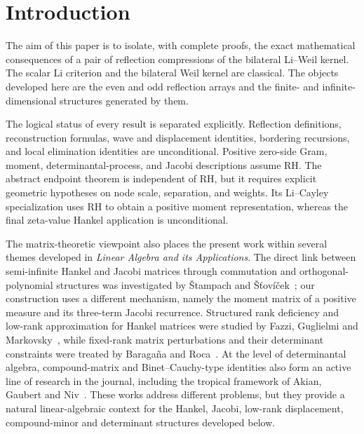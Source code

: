 \documentclass[preprint,12pt]{elsarticle}
\numberwithin{equation}{section}
\theoremstyle{plain}
\theoremstyle{definition}
\theoremstyle{remark}
\newcommand{\RH}{\mathrm{RH}}
\begin{document}
\section{Introduction}
The aim of this paper is to isolate, with complete proofs, the exact
mathematical consequences of a pair of reflection compressions of the bilateral Li--Weil kernel.
The scalar Li criterion and the bilateral Weil kernel are classical.  The objects developed here
are the even and odd reflection arrays and the finite- and infinite-dimensional structures
generated by them.

The logical status of every result is separated explicitly.  Reflection definitions,
reconstruction formulas, wave and displacement identities, bordering recursions, and local
elimination identities are unconditional.  Positive zero-side Gram, moment, determinantal-process,
and Jacobi descriptions assume \(\RH\).  The abstract endpoint theorem is independent of
\(\RH\), but it requires explicit geometric hypotheses on node scale, separation, and weights.
Its Li--Cayley specialization uses \(\RH\) to obtain a positive moment representation, whereas
the final zeta-value Hankel application is unconditional.

The matrix-theoretic viewpoint also places the present work within several themes developed in
\emph{Linear Algebra and its Applications}.  The direct link between semi-infinite Hankel and
Jacobi matrices through commutation and orthogonal-polynomial structures was investigated by
\v{S}tampach and \v{S}\v{t}ov\'i\v{c}ek~\cite{StampachStovicek2020}; our construction uses a
different mechanism, namely the moment matrix of a positive measure and its three-term Jacobi
recurrence.  Structured rank deficiency and low-rank approximation for Hankel matrices were
studied by Fazzi, Guglielmi and Markovsky~\cite{FazziGuglielmiMarkovsky2021}, while fixed-rank
matrix perturbations and their determinant constraints were treated by Baraga\~na and
Roca~\cite{BaraganaRoca2020}.  At the level of determinantal algebra, compound-matrix and
Binet--Cauchy-type identities also form an active line of research in the journal, including the
tropical framework of Akian, Gaubert and Niv~\cite{AkianGaubertNiv2018}.  These works address
different problems, but they provide a natural linear-algebraic context for the Hankel, Jacobi,
low-rank displacement, compound-minor and determinant structures developed below.
\end{document}
